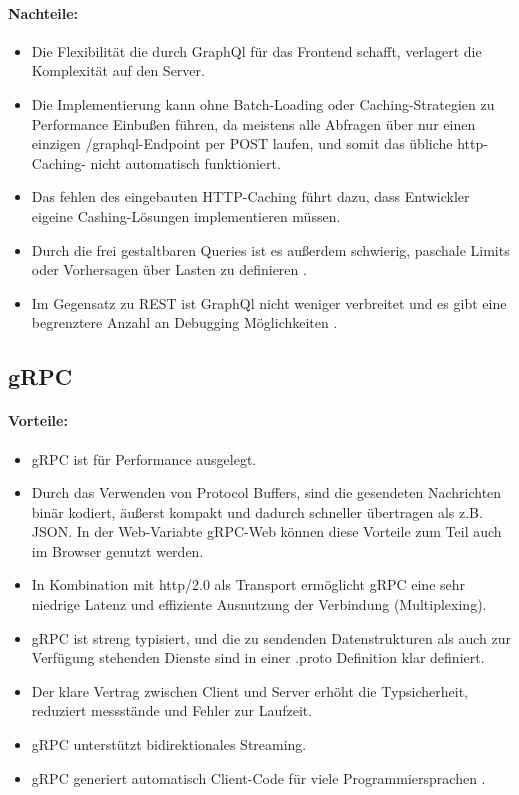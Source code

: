 \paragraph{Nachteile:}
\begin{itemize}
	\item Die Flexibilität die durch GraphQl für das Frontend schafft, verlagert die Komplexität auf den Server. 
	\item Die Implementierung kann ohne Batch-Loading oder Caching-Strategien zu Performance Einbußen führen, da meistens alle Abfragen über nur einen einzigen /graphql-Endpoint per POST laufen, und somit das übliche http-Caching- nicht automatisch funktioniert. 
	\item Das fehlen des eingebauten HTTP-Caching führt dazu, dass Entwickler eigeine Cashing-Lösungen implementieren müssen. 
	\item Durch die frei gestaltbaren Queries ist es außerdem schwierig, paschale Limits oder Vorhersagen über Lasten zu definieren \parencite{graphql-org,amazon2025graphql,redhat-apiguide}.
	\item Im Gegensatz zu REST ist GraphQl nicht weniger verbreitet und es gibt eine begrenztere Anzahl an Debugging Möglichkeiten \parencite{postman2022, postman2023}.
\end{itemize}

\subsection{gRPC}

\paragraph{Vorteile:}
\begin{itemize}
	\item gRPC ist für Performance ausgelegt.  
	\item Durch das Verwenden von Protocol Buffers, sind die gesendeten Nachrichten binär kodiert, äußerst kompakt und dadurch schneller übertragen als z.B. JSON. In der Web-Variabte gRPC-Web können diese Vorteile zum Teil auch im Browser genutzt werden. 
	\item In Kombination mit http/2.0 als Transport ermöglicht gRPC eine sehr niedrige Latenz und effiziente Ausnutzung der Verbindung (Multiplexing). 
	\item gRPC ist streng typisiert, und die zu sendenden Datenstrukturen als auch zur Verfügung stehenden Dienste sind in einer .proto Definition klar definiert. 
	\item Der klare Vertrag zwischen Client und Server erhöht die Typsicherheit, reduziert messstände und Fehler zur Laufzeit.
	\item gRPC unterstützt bidirektionales Streaming. 
	\item gRPC generiert automatisch Client-Code für viele Programmiersprachen \parencite{gRPCAbout}.
\end{itemize}

